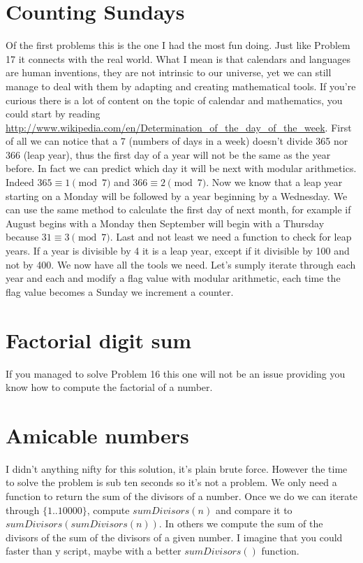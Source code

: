 \documentclass[11pt]{article}
\begin{document}
\section{Counting Sundays}
Of the first problems this is the one I had the most fun doing. Just like Problem 17 it connects with the real world. What I mean is that calendars and languages are human inventions, they are not intrinsic to our universe, yet we can still manage to deal with them by adapting and creating mathematical tools. If you're curious there is a lot of content on the topic of calendar and mathematics, you could start by reading \url{http://www.wikipedia.com/en/Determination_of_the_day_of_the_week}. First of all we can notice that a 7 (numbers of days in a week) doesn't divide 365 nor 366 (leap year), thus the first day of a year will not be the same as the year before. In fact we can predict which day it will be next with modular arithmetics. Indeed $365 \equiv 1 \pmod 7$ and $366 \equiv 2 \pmod 7$. Now we know that a leap year starting on a Monday will be followed by a year beginning by a Wednesday. We can use the same method to calculate the first day of next month, for example if August begins with a Monday then September will begin with a Thursday because $31 \equiv 3 \pmod 7$. Last and not least we need a function to check for leap years. If a year is divisible by 4 it is a leap year, except if it divisible by 100 and not by 400. We now have all the tools we need. Let's sumply iterate through each year and each and modify a flag value with modular arithmetic, each time the flag value becomes a Sunday we increment a counter.

\section{Factorial digit sum}
If you managed to solve Problem 16 this one will not be an issue providing you know how to compute the factorial of a number.

\section{Amicable numbers}
I didn't anything nifty for this solution, it's plain brute force. However the time to solve the problem is sub ten seconds so it's not a problem. We only need a function to return the sum of the divisors of a number. Once we do we can iterate through $\{1..10000\}$, compute $sumDivisors(n)$ and compare it to $sumDivisors(sumDivisors(n))$. In others we compute the sum of the divisors of the sum of the divisors of a given number. I imagine that you could faster than y script, maybe with a better $sumDivisors()$ function.
\end{document}
